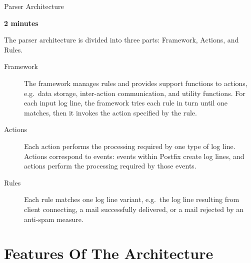 \documentclass{beamer}
\newcommand{\timingnote}[1]{%
    \textbf{#1}%
}
\begin{document}
\begin{frame}{Parser Architecture}

    \timingnote{2 minutes}

    The parser architecture is divided into three parts: Framework,
    Actions, and Rules.

    \begin{description}

        \item [Framework] The framework manages rules and provides support
            functions to actions, e.g.\ data storage, inter-action
            communication, and utility functions.  For each input log line,
            the framework tries each rule in turn until one matches, then
            it invokes the action specified by the rule.

        \item [Actions] Each action performs the processing required by one
            type of log line.  Actions correspond to events: events within
            Postfix create log lines, and actions perform the processing
            required by those events.

        \item [Rules] Each rule matches one log line variant, e.g.\ the log
            line resulting from client connecting, a mail successfully
            delivered, or a mail rejected by an anti-spam measure.

    \end{description}

\end{frame}

\section{Features Of The Architecture}
\end{document}

